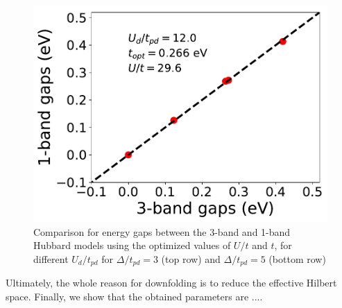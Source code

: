 \begin{figure}[]
\includegraphics[width=0.325\linewidth]{./Figures/Gap_1_band_3_band_ep_5_number_2.pdf}
\caption{Comparison for energy gaps between the 3-band and 1-band Hubbard models 
using the optimized values of $U/t$ and $t$, for different $U_{d}/t_{pd}$ for $\Delta/t_{pd}=3$ (top row) 
and $\Delta/t_{pd}=5$ (bottom row)}
\label{fig:energyfit} 
\end{figure}	

 Ultimately, the whole reason for downfolding is to reduce the effective Hilbert space. 
Finally, we show that the obtained parameters are ....

